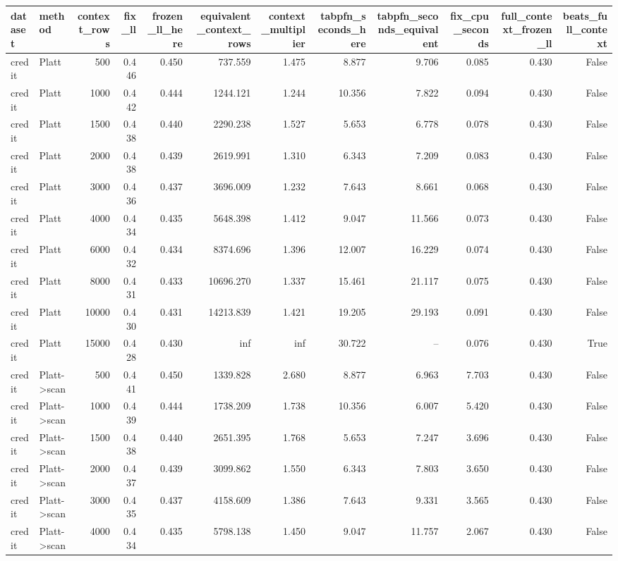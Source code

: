 \begin{tabular}{llrrrrrrrrrr}
\toprule
dataset & method & context_rows & fix_ll & frozen_ll_here & equivalent_context_rows & context_multiplier & tabpfn_seconds_here & tabpfn_seconds_equivalent & fix_cpu_seconds & full_context_frozen_ll & beats_full_context \\
\midrule
credit & Platt & 500 & 0.446 & 0.450 & 737.559 & 1.475 & 8.877 & 9.706 & 0.085 & 0.430 & False \\
credit & Platt & 1000 & 0.442 & 0.444 & 1244.121 & 1.244 & 10.356 & 7.822 & 0.094 & 0.430 & False \\
credit & Platt & 1500 & 0.438 & 0.440 & 2290.238 & 1.527 & 5.653 & 6.778 & 0.078 & 0.430 & False \\
credit & Platt & 2000 & 0.438 & 0.439 & 2619.991 & 1.310 & 6.343 & 7.209 & 0.083 & 0.430 & False \\
credit & Platt & 3000 & 0.436 & 0.437 & 3696.009 & 1.232 & 7.643 & 8.661 & 0.068 & 0.430 & False \\
credit & Platt & 4000 & 0.434 & 0.435 & 5648.398 & 1.412 & 9.047 & 11.566 & 0.073 & 0.430 & False \\
credit & Platt & 6000 & 0.432 & 0.434 & 8374.696 & 1.396 & 12.007 & 16.229 & 0.074 & 0.430 & False \\
credit & Platt & 8000 & 0.431 & 0.433 & 10696.270 & 1.337 & 15.461 & 21.117 & 0.075 & 0.430 & False \\
credit & Platt & 10000 & 0.430 & 0.431 & 14213.839 & 1.421 & 19.205 & 29.193 & 0.091 & 0.430 & False \\
credit & Platt & 15000 & 0.428 & 0.430 & inf & inf & 30.722 & -- & 0.076 & 0.430 & True \\
credit & Platt->scan & 500 & 0.441 & 0.450 & 1339.828 & 2.680 & 8.877 & 6.963 & 7.703 & 0.430 & False \\
credit & Platt->scan & 1000 & 0.439 & 0.444 & 1738.209 & 1.738 & 10.356 & 6.007 & 5.420 & 0.430 & False \\
credit & Platt->scan & 1500 & 0.438 & 0.440 & 2651.395 & 1.768 & 5.653 & 7.247 & 3.696 & 0.430 & False \\
credit & Platt->scan & 2000 & 0.437 & 0.439 & 3099.862 & 1.550 & 6.343 & 7.803 & 3.650 & 0.430 & False \\
credit & Platt->scan & 3000 & 0.435 & 0.437 & 4158.609 & 1.386 & 7.643 & 9.331 & 3.565 & 0.430 & False \\
credit & Platt->scan & 4000 & 0.434 & 0.435 & 5798.138 & 1.450 & 9.047 & 11.757 & 2.067 & 0.430 & False \\

\end{tabular}
